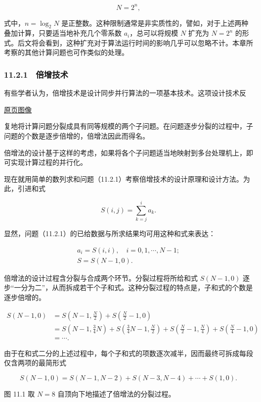 \documentclass[
  10pt,
  fontset=fandol]{ctexart}
\begin{document}
\[
N=2^n,
\]

式中，\(n=\log_2 N\) 是正整数。这种限制通常是非实质性的，譬如，对于上述两种叠加计算，只要适当地补充几个零系数 \(a_i\)，总可以将规模 \(N\) 扩充为 \(N=2^n\) 的形式。后文将会看到，这种扩充对于算法运行时间的影响几乎可以忽略不计。本章所考察的其他计算问题也可作类似的处理。

\subsubsection{11.2.1　倍增技术}\label{ux500dux589eux6280ux672f}

有些学者认为，倍增技术是设计同步并行算法的一项基本技术。这项设计技术反

\href{../../source-images/pdf-279.jpeg}{原页图像}

复地将计算问题分裂成具有同等规模的两个子问题。在问题逐步分裂的过程中，子问题的个数是逐步倍增的，倍增法因此而得名。

倍增法的设计基于这样的考虑，如果将各个子问题适当地映射到多台处理机上，即可实现计算过程的并行化。

现在就用简单的数列求和问题（11.2.1）考察倍增技术的设计原理和设计方法。为此，引进和式

\[
S(i,j)=\sum_{k=j}^{i}a_k.
\]

显然，问题（11.2.1）的已给数据与所求结果均可用这种和式来表达：

\[
\begin{gathered}
a_i=S(i,i),\quad i=0,1,\cdots,N-1;\\
S=S(N-1,0).
\end{gathered}
\]

倍增法的设计过程含分裂与合成两个环节。分裂过程将所给和式 \(S(N-1,0)\) 逐步``一分为二''，从而拆成若干个子和式。这种分裂过程的特点是，子和式的个数是逐步倍增的。

\[
\begin{aligned}
S(N-1,0)
&=S\left(N-1,\frac{N}{2}\right)+S\left(\frac{N}{2}-1,0\right)\\
&=S\left(N-1,\frac{3}{4}N\right)+S\left(\frac{3}{4}N-1,\frac{N}{2}\right)+S\left(\frac{N}{2}-1,\frac{N}{4}\right)+S\left(\frac{N}{4}-1,0\right)\\
&=\cdots.
\end{aligned}
\]

由于在和式二分的上述过程中，每个子和式的项数逐次减半，因而最终可拆成每段仅含两项的最简形式

\[
S(N-1,0)=S(N-1,N-2)+S(N-3,N-4)+\cdots+S(1,0).
\]

图 11.1 取 \(N=8\) 自顶向下地描述了倍增法的分裂过程。
\end{document}

